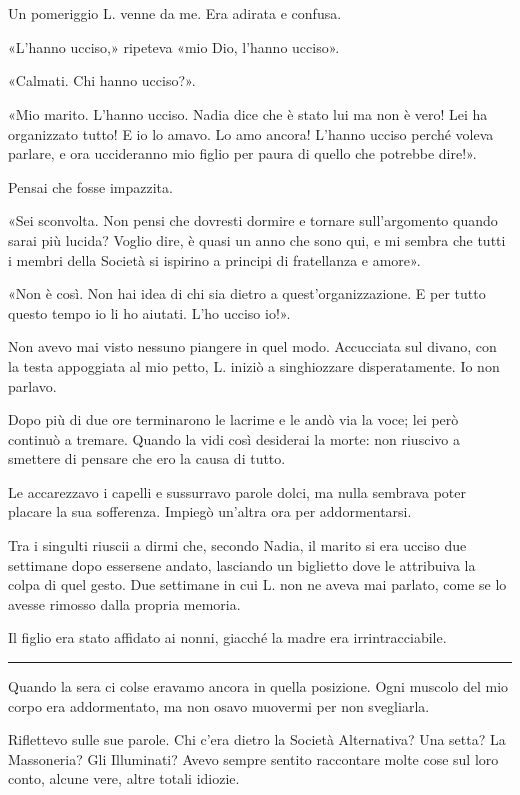 \chapter{}
\label{ch:6}

Un pomeriggio L. venne da me. Era adirata e confusa.

«L'hanno ucciso,» ripeteva «mio Dio, l'hanno ucciso».

«Calmati. Chi hanno ucciso?».

«Mio marito. L'hanno ucciso. Nadia dice che è stato lui ma non è vero! Lei ha organizzato tutto! E
io lo amavo. Lo amo ancora! L'hanno ucciso perché voleva parlare, e ora uccideranno mio figlio per
paura di quello che potrebbe dire!».

Pensai che fosse impazzita.

«Sei sconvolta. Non pensi che dovresti dormire e tornare sull'argomento quando sarai più lucida?
Voglio dire, è quasi un anno che sono qui, e mi sembra che tutti i membri della Società si ispirino
a principi di fratellanza e amore».

«Non è così. Non hai idea di chi sia dietro a quest'organizzazione. E per tutto questo tempo io li
ho aiutati. L'ho ucciso io!».

Non avevo mai visto nessuno piangere in quel modo. Accucciata sul divano, con la testa appoggiata al
mio petto, L. iniziò a singhiozzare disperatamente. Io non parlavo.

Dopo più di due ore terminarono le lacrime e le andò via la voce; lei però continuò a tremare.
Quando la vidi così desiderai la morte: non riuscivo a smettere di pensare che ero la causa di
tutto.

Le accarezzavo i capelli e sussurravo parole dolci, ma nulla sembrava poter placare la sua
sofferenza. Impiegò un'altra ora per addormentarsi.

Tra i singulti riuscii a dirmi che, secondo Nadia, il marito si era ucciso due settimane dopo
essersene andato, lasciando un biglietto dove le attribuiva la colpa di quel gesto. Due settimane in
cui L. non ne aveva mai parlato, come se lo avesse rimosso dalla propria memoria.

Il figlio era stato affidato ai nonni, giacché la madre era irrintracciabile.

\plainbreak{1}

Quando la sera ci colse eravamo ancora in quella posizione. Ogni muscolo del mio corpo era
addormentato, ma non osavo muovermi per non svegliarla.

Riflettevo sulle sue parole. Chi c'era dietro la Società Alternativa? Una setta? La Massoneria? Gli
Illuminati? Avevo sempre sentito raccontare molte cose sul loro conto, alcune vere, altre totali
idiozie.

